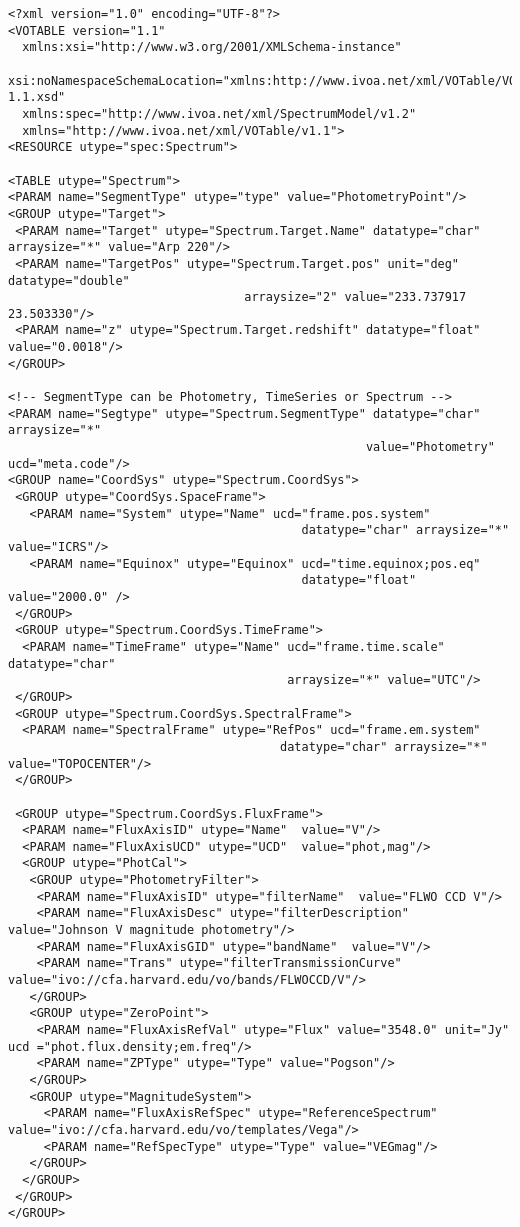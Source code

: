 

{ \footnotesize
\begin{flushleft}


\begin{fmpage}

\begin{verbatim}
<?xml version="1.0" encoding="UTF-8"?>
<VOTABLE version="1.1"
  xmlns:xsi="http://www.w3.org/2001/XMLSchema-instance"
  xsi:noNamespaceSchemaLocation="xmlns:http://www.ivoa.net/xml/VOTable/VOTable-1.1.xsd" 
  xmlns:spec="http://www.ivoa.net/xml/SpectrumModel/v1.2"
  xmlns="http://www.ivoa.net/xml/VOTable/v1.1">
<RESOURCE utype="spec:Spectrum">

<TABLE utype="Spectrum">   
<PARAM name="SegmentType" utype="type" value="PhotometryPoint"/>
<GROUP utype="Target">
 <PARAM name="Target" utype="Spectrum.Target.Name" datatype="char" arraysize="*" value="Arp 220"/>
 <PARAM name="TargetPos" utype="Spectrum.Target.pos" unit="deg" datatype="double" 
                                 arraysize="2" value="233.737917 23.503330"/>
 <PARAM name="z" utype="Spectrum.Target.redshift" datatype="float" value="0.0018"/>
</GROUP>

<!-- SegmentType can be Photometry, TimeSeries or Spectrum -->
<PARAM name="Segtype" utype="Spectrum.SegmentType" datatype="char" arraysize="*" 
                                                  value="Photometry" ucd="meta.code"/>
<GROUP name="CoordSys" utype="Spectrum.CoordSys">
 <GROUP utype="CoordSys.SpaceFrame">
   <PARAM name="System" utype="Name" ucd="frame.pos.system" 
                                         datatype="char" arraysize="*" value="ICRS"/>
   <PARAM name="Equinox" utype="Equinox" ucd="time.equinox;pos.eq" 
                                         datatype="float" value="2000.0" />
 </GROUP>
 <GROUP utype="Spectrum.CoordSys.TimeFrame">
  <PARAM name="TimeFrame" utype="Name" ucd="frame.time.scale" datatype="char" 
                                       arraysize="*" value="UTC"/>
 </GROUP>
 <GROUP utype="Spectrum.CoordSys.SpectralFrame">
  <PARAM name="SpectralFrame" utype="RefPos" ucd="frame.em.system" 
                                      datatype="char" arraysize="*" value="TOPOCENTER"/>
 </GROUP>

 <GROUP utype="Spectrum.CoordSys.FluxFrame">
  <PARAM name="FluxAxisID" utype="Name"  value="V"/>
  <PARAM name="FluxAxisUCD" utype="UCD"  value="phot,mag"/>
  <GROUP utype="PhotCal">
   <GROUP utype="PhotometryFilter">
    <PARAM name="FluxAxisID" utype="filterName"  value="FLWO CCD V"/>
    <PARAM name="FluxAxisDesc" utype="filterDescription"  value="Johnson V magnitude photometry"/>
    <PARAM name="FluxAxisGID" utype="bandName"  value="V"/>
    <PARAM name="Trans" utype="filterTransmissionCurve" value="ivo://cfa.harvard.edu/vo/bands/FLWOCCD/V"/>
   </GROUP> 
   <GROUP utype="ZeroPoint">
    <PARAM name="FluxAxisRefVal" utype="Flux" value="3548.0" unit="Jy" ucd ="phot.flux.density;em.freq"/>
    <PARAM name="ZPType" utype="Type" value="Pogson"/>
   </GROUP>
   <GROUP utype="MagnitudeSystem">
     <PARAM name="FluxAxisRefSpec" utype="ReferenceSpectrum" value="ivo://cfa.harvard.edu/vo/templates/Vega"/>
     <PARAM name="RefSpecType" utype="Type" value="VEGmag"/>
   </GROUP>
  </GROUP>
 </GROUP>
</GROUP>


\end{verbatim}
\end{fmpage}
\end{flushleft}}
